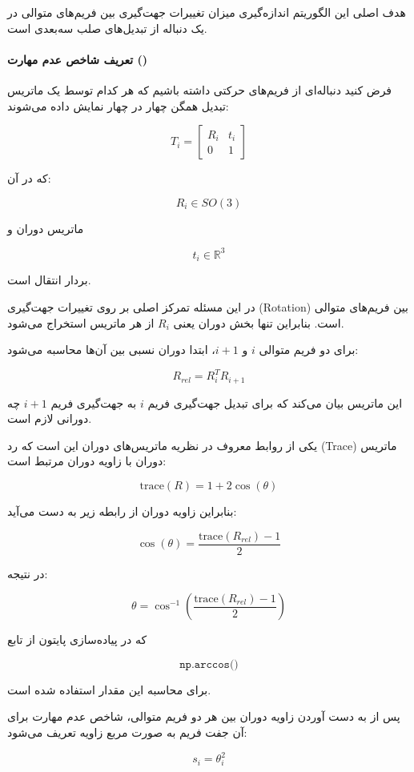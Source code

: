 \documentclass{article}
\begin{document}
هدف اصلی این الگوریتم اندازه‌گیری میزان تغییرات جهت‌گیری بین فریم‌های متوالی در یک دنباله از تبدیل‌های صلب سه‌بعدی است.

\paragraph{تعریف شاخص عدم مهارت ()}

فرض کنید دنباله‌ای از فریم‌های حرکتی داشته باشیم که هر کدام توسط یک ماتریس تبدیل همگن چهار در چهار نمایش داده می‌شوند:

\[
T_i =
\begin{bmatrix}
	R_i & t_i \\
	0 & 1
\end{bmatrix}
\]

که در آن:

\[
R_i \in SO(3)
\]

ماتریس دوران و

\[
t_i \in \mathbb{R}^3
\]

بردار انتقال است.

در این مسئله تمرکز اصلی بر روی تغییرات جهت‌گیری (Rotation) بین فریم‌های متوالی است. بنابراین تنها بخش دوران یعنی \(R_i\) از هر ماتریس استخراج می‌شود.

برای دو فریم متوالی \(i\) و \(i+1\)، ابتدا دوران نسبی بین آن‌ها محاسبه می‌شود:

\[
R_{rel} = R_i^T R_{i+1}
\]

این ماتریس بیان می‌کند که برای تبدیل جهت‌گیری فریم \(i\) به جهت‌گیری فریم \(i+1\) چه دورانی لازم است.

یکی از روابط معروف در نظریه ماتریس‌های دوران این است که رد (Trace) ماتریس دوران با زاویه دوران مرتبط است:

\[
\text{trace}(R) = 1 + 2\cos(\theta)
\]

بنابراین زاویه دوران از رابطه زیر به دست می‌آید:

\[
\cos(\theta) = \frac{\text{trace}(R_{rel}) - 1}{2}
\]

در نتیجه:

\[
\theta = \cos^{-1}\left(\frac{\text{trace}(R_{rel}) - 1}{2}\right)
\]

که در پیاده‌سازی پایتون از تابع

\[
\texttt{np.arccos()}
\]

برای محاسبه این مقدار استفاده شده است.

پس از به دست آوردن زاویه دوران بین هر دو فریم متوالی، شاخص عدم مهارت برای آن جفت فریم به صورت مربع زاویه تعریف می‌شود:

\[
s_i = \theta_i^2
\]
\end{document}
